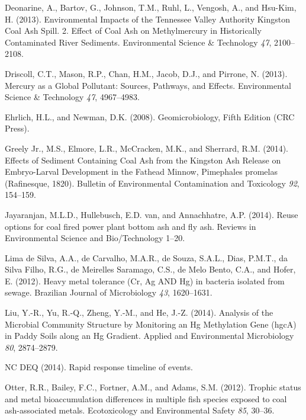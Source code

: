 \documentclass[ms]{uncgdissertationexp}
\theoremstyle{plain}
\theoremstyle{definition}
\theoremstyle{remark}
\begin{document}
  \hypertarget{ref-deonarineEnvironmentalImpactsTennessee2013}{}
  Deonarine, A., Bartov, G., Johnson, T.M., Ruhl, L., Vengosh, A., and
  Hsu-Kim, H. (2013). Environmental Impacts of the Tennessee Valley
  Authority Kingston Coal Ash Spill. 2. Effect of Coal Ash on
  Methylmercury in Historically Contaminated River Sediments.
  Environmental Science \& Technology \emph{47}, 2100--2108.
  
  \hypertarget{ref-driscollMercuryGlobalPollutant2013}{}
  Driscoll, C.T., Mason, R.P., Chan, H.M., Jacob, D.J., and Pirrone, N.
  (2013). Mercury as a Global Pollutant: Sources, Pathways, and Effects.
  Environmental Science \& Technology \emph{47}, 4967--4983.
  
  \hypertarget{ref-ehrlichGeomicrobiologyFifthEdition2008}{}
  Ehrlich, H.L., and Newman, D.K. (2008). Geomicrobiology, Fifth Edition
  (CRC Press).
  
  \hypertarget{ref-greelyjr.EffectsSedimentContaining2014}{}
  Greely Jr., M.S., Elmore, L.R., McCracken, M.K., and Sherrard, R.M.
  (2014). Effects of Sediment Containing Coal Ash from the Kingston Ash
  Release on Embryo-Larval Development in the Fathead Minnow, Pimephales
  promelas (Rafinesque, 1820). Bulletin of Environmental Contamination and
  Toxicology \emph{92}, 154--159.
  
  \hypertarget{ref-jayaranjanReuseOptionsCoal2014}{}
  Jayaranjan, M.L.D., Hullebusch, E.D. van, and Annachhatre, A.P. (2014).
  Reuse options for coal fired power plant bottom ash and fly ash. Reviews
  in Environmental Science and Bio/Technology 1--20.
  
  \hypertarget{ref-limadesilvaHeavyMetalTolerance2012}{}
  Lima de Silva, A.A., de Carvalho, M.A.R., de Souza, S.A.L., Dias,
  P.M.T., da Silva Filho, R.G., de Meirelles Saramago, C.S., de Melo
  Bento, C.A., and Hofer, E. (2012). Heavy metal tolerance (Cr, Ag AND Hg)
  in bacteria isolated from sewage. Brazilian Journal of Microbiology
  \emph{43}, 1620--1631.
  
  \hypertarget{ref-liuAnalysisMicrobialCommunity2014}{}
  Liu, Y.-R., Yu, R.-Q., Zheng, Y.-M., and He, J.-Z. (2014). Analysis of
  the Microbial Community Structure by Monitoring an Hg Methylation Gene
  (hgcA) in Paddy Soils along an Hg Gradient. Applied and Environmental
  Microbiology \emph{80}, 2874--2879.
  
  \hypertarget{ref-ncdeqRapidResponseTimeline2014}{}
  NC DEQ (2014). Rapid response timeline of events.
  
  \hypertarget{ref-otterTrophicStatusMetal2012}{}
  Otter, R.R., Bailey, F.C., Fortner, A.M., and Adams, S.M. (2012).
  Trophic status and metal bioaccumulation differences in multiple fish
  species exposed to coal ash-associated metals. Ecotoxicology and
  Environmental Safety \emph{85}, 30--36.
  
\end{document}
